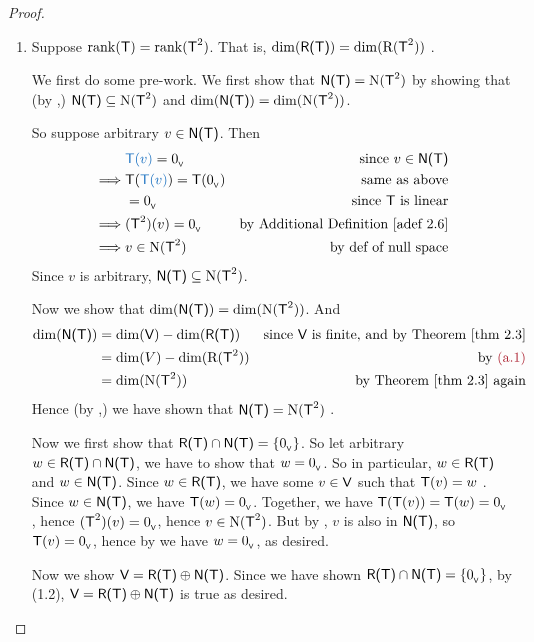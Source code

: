 \begin{proof} \ 

\begin{enumerate}
\item Suppose \(\mathrm{rank}(\textsf{T}) = \mathrm{rank}(\textsf{T}^2)\).
That is, \(\dim(\textsf{R(T)}) = \dim(\mathrm{R}(\textsf{T}^2))\) .

We first do some pre-work.
We first show that \(\textsf{N(T)} = \mathrm{N}(\textsf{T}^2)\) by showing that (by ,) \(\textsf{N(T)} \subseteq \mathrm{N}(\textsf{T}^2)\) and \(\dim(\textsf{N(T)}) = \dim(\mathrm{N}(\textsf{T}^2))\).

So suppose arbitrary \(v \in \textsf{N(T)}\).
Then
\begin{align*}
             & \BLUE{\T(v)} = \OV & \text{since \(v \in \NULLT\)} \\
    \implies & \T(\BLUE{\T(v)}) = \T(\OV) & \text{same as above} \\
             & = \OV & \text{since \(\T\) is linear} \\
    \implies & (\T^2)(v) = \OV & \text{by \ADEF{2.6}} \\
    \implies & v \in \NULL(\T^2) & \text{by def of null space}
\end{align*}
Since \(v\) is arbitrary, \(\textsf{N(T)} \subseteq \mathrm{N}(\textsf{T}^2)\).

Now we show that \(\dim(\textsf{N(T)}) = \dim(\mathrm{N}(\textsf{T}^2))\).
And
\begin{align*}
    \dim(\NULLT) & = \dim(\V) - \dim(\RANGET) & \text{since \(\V\) is finite, and by \THM{2.3}} \\
                 & = \dim(V) - \dim(\RANGE(\T^2)) & \text{by \MAROON{(a.1)}} \\
                 & = \dim(\NULL(\T^2)) & \text{by \THM{2.3} again}
\end{align*}
Hence (by ,) we have shown that \(\textsf{N(T)} = \mathrm{N}(\textsf{T}^2)\) .

Now we first show that \(\textsf{R(T)} \cap \textsf{N(T)} = \{ 0_{_{\textsf{V}}} \}\).
So let arbitrary \(w \in \textsf{R(T)} \cap \textsf{N(T)}\), we have to show that \(w = 0_{_{\textsf{V}}}\).
So in particular, \(w \in \textsf{R(T)}\) and \(w \in \textsf{N(T)}\).
Since \(w \in \textsf{R(T)}\), we have some \(v \in \textsf{V}\) such that \(\textsf{T}(v) = w\) .
Since \(w \in \textsf{N(T)}\), we have \(\textsf{T}(w) = 0_{_{\textsf{V}}}\).
Together, we have \(\textsf{T}(\textsf{T}(v)) = \textsf{T}(w) = 0_{_{\textsf{V}}}\), hence \((\textsf{T}^2)(v) = 0_{_{\textsf{V}}}\), hence \(v \in \mathrm{N}(\textsf{T}^2)\).
But by , \(v\) is also in \(\textsf{N(T)}\), so \(\textsf{T}(v) = 0_{_{\textsf{V}}}\), hence by  we have \(w = 0_{_{\textsf{V}}}\), as desired.

Now we show \(\textsf{V} = \textsf{R(T)} \oplus \textsf{N(T)}\).
Since we have shown \(\textsf{R(T)} \cap \textsf{N(T)} = \{ 0_{_{\textsf{V}}} \}\), by (1.2), \(\textsf{V} = \textsf{R(T)} \oplus \textsf{N(T)}\) is true as desired.


\end{enumerate}
\end{proof}
